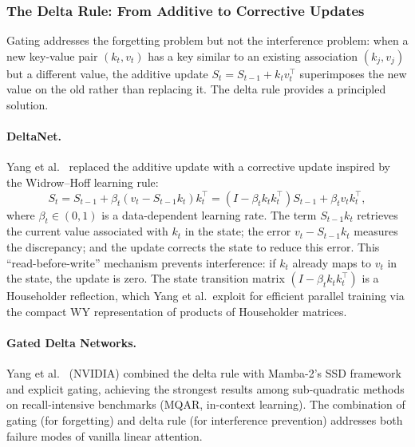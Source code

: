 \subsubsection{The Delta Rule: From Additive to Corrective Updates}

Gating addresses the forgetting problem but not the interference problem: when a new key-value pair $(k_t, v_t)$ has a key similar to an existing association $(k_j, v_j)$ but a different value, the additive update $S_t = S_{t-1} + k_t v_t^\top$ superimposes the new value on the old rather than replacing it. The delta rule provides a principled solution.

\paragraph{DeltaNet.}
Yang et al.~\cite{yang2024deltanet} replaced the additive update with a corrective update inspired by the Widrow--Hoff learning rule:
\begin{equation}
S_t = S_{t-1} + \beta_t (v_t - S_{t-1} k_t) k_t^\top = (I - \beta_t k_t k_t^\top) S_{t-1} + \beta_t v_t k_t^\top,
\label{eq:deltanet}
\end{equation}
where $\beta_t \in (0, 1)$ is a data-dependent learning rate. The term $S_{t-1} k_t$ retrieves the current value associated with $k_t$ in the state; the error $v_t - S_{t-1} k_t$ measures the discrepancy; and the update corrects the state to reduce this error. This ``read-before-write'' mechanism prevents interference: if $k_t$ already maps to $v_t$ in the state, the update is zero. The state transition matrix $(I - \beta_t k_t k_t^\top)$ is a Householder reflection, which Yang et al.\ exploit for efficient parallel training via the compact WY representation of products of Householder matrices.

\paragraph{Gated Delta Networks.}
Yang et al.~\cite{yang2024gated} (NVIDIA) combined the delta rule with Mamba-2's SSD framework and explicit gating, achieving the strongest results among sub-quadratic methods on recall-intensive benchmarks (MQAR, in-context learning). The combination of gating (for forgetting) and delta rule (for interference prevention) addresses both failure modes of vanilla linear attention.

